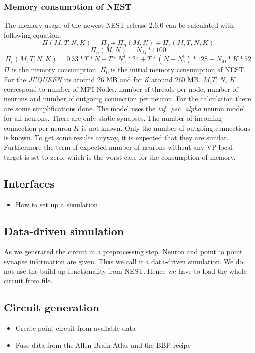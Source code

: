 \documentclass[a4paper]{article}
\begin{document}
\subsubsection{Memory consumption of NEST}
The memory usage of the newest NEST release 2.6.0 can be calculated with following equation. \cite{kunkel2014spiking}
\begin{equation}
  \Pi(M,T,N,K) =  \Pi_0 + \Pi_n(M,N)  + \Pi_c(M,T,N,K)
  \label{eq:NESTmemconsumption}
\end{equation} 
\begin{equation}
  \Pi_n(M,N) = N_M*1100
\end{equation}
\begin{equation}
  \Pi_c(M,T,N,K) = 0.33 * T * N + T * N^1_c * 24 + T*(N-N^1_c)*128 + N_M*K*52
\end{equation}
$\Pi$ is the memory consumption. $\Pi_0$ is the initial memory consumption of NEST.
For the \emph{JUQUEEN} its around 26 MB and for \emph{K} around 260 MB.
$M$,$T$, $N$, $K$ correspond to number of MPI Nodes, number of threads per node, number of neurons and number of outgoing connection per neuron.
For the calculation there are some simplifications done.
The model uses the \emph{iaf\_psc\_alpha} neuron model for all neurons. There are only static synapses.
The number of incoming connection per neuron $K$ is not known. Only the number of outgoing connections is known.
To get some results anyway, it is expected that they are similar.
Furthermore the term of expected number of neurons without any VP-local target is set to zero, which is the worst case for the consumption of memory.

\subsection{Interfaces}
\begin{itemize}
      \item How to set up a simulation
\end{itemize}

\subsection{Data-driven simulation}
As we generated the circuit in a preprocessing step. Neuron and point to point synapse information are given.
Thus we call it a data-driven simulation. We do not use the build-up functionality from NEST.
Hence we have to load the whole circuit from file.

\subsection{Circuit generation}
\begin{itemize}
      \item Create point circuit from available data
      \item Fuse data from the Allen Brain Atlas and the BBP recipe
   \end{itemize}
\end{document}
